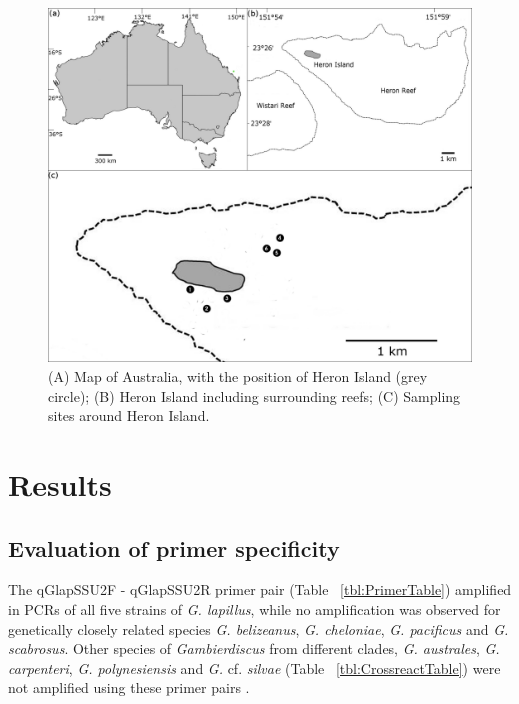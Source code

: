\documentclass[12pt]{article}
\begin{document}
\begin{figure} 
\includegraphics[scale=1.7]{Hero_qpcr-figs/Fig1_Heron_sample-map_May18.png} 
\caption{(A) Map of Australia, with the position of Heron Island (grey circle); (B) Heron Island including surrounding reefs; (C) Sampling sites around Heron Island.} 
\label{fig:samplesites}
\end{figure} 


\newpage
\section*{Results}
\subsection*{Evaluation of primer specificity}
\FloatBarrier
The qGlapSSU2F - qGlapSSU2R primer pair (Table ~\ref{tbl:PrimerTable}) amplified in PCRs of all five strains of \emph{G. lapillus}, while no amplification was observed for genetically closely related species \emph{G. belizeanus}, \emph{G. cheloniae}, \emph{G. pacificus} and \emph{G. scabrosus}. 
Other species of \emph{Gambierdiscus} from different clades, \emph{G. australes}, \emph{G. carpenteri}, \emph{G. polynesiensis} and \emph{G.} cf. \emph{silvae} (Table ~\ref{tbl:CrossreactTable}) were not amplified using these primer pairs \citep{smith2016new,kretzschmar2017characterization}.
\end{document}
